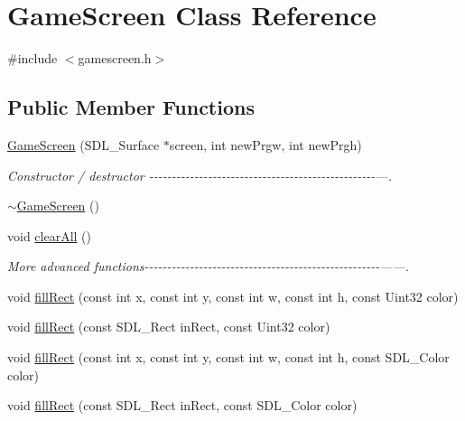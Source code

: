\hypertarget{classGameScreen}{}\section{Game\+Screen Class Reference}
\label{classGameScreen}


{\ttfamily \#include $<$gamescreen.\+h$>$}

\subsection*{Public Member Functions}
\begin{DoxyCompactItemize}
\item 
\hyperlink{classGameScreen_a261e48ed7a96ea0df0a45a524fdc0f9a}{Game\+Screen} (S\+D\+L\+\_\+\+Surface $\ast$screen, int new\+Prgw, int new\+Prgh)
\begin{DoxyCompactList}\small\item\em Constructor / destructor -\/-\/-\/-\/-\/-\/-\/-\/-\/-\/-\/-\/-\/-\/-\/-\/-\/-\/-\/-\/-\/-\/-\/-\/-\/-\/-\/-\/-\/-\/-\/-\/-\/-\/-\/-\/-\/-\/-\/-\/-\/-\/-\/-\/-\/-\/-\/-\/-\/-\/---. \end{DoxyCompactList}\item 
\hyperlink{classGameScreen_a0d25dfce42d72954aab40dbccbf1a0b1}{$\sim$\+Game\+Screen} ()
\item 
void \hyperlink{classGameScreen_ae4ba46c43b5c210f9f01c3742a7de32a}{clear\+All} ()
\begin{DoxyCompactList}\small\item\em More advanced functions-\/-\/-\/-\/-\/-\/-\/-\/-\/-\/-\/-\/-\/-\/-\/-\/-\/-\/-\/-\/-\/-\/-\/-\/-\/-\/-\/-\/-\/-\/-\/-\/-\/-\/-\/-\/-\/-\/-\/-\/-\/-\/-\/-\/-\/-\/-\/-\/-\/-\/-\/-\/------. \end{DoxyCompactList}\item 
void \hyperlink{classGameScreen_aecc2e4702ee552f8910674098f58d78a}{fill\+Rect} (const int x, const int y, const int w, const int h, const Uint32 color)
\item 
void \hyperlink{classGameScreen_ab6288b5bf5e4b55f13dd0fa57bb00cdd}{fill\+Rect} (const S\+D\+L\+\_\+\+Rect in\+Rect, const Uint32 color)
\item 
void \hyperlink{classGameScreen_ae953ed6c4d9d05ed833aca57197251ce}{fill\+Rect} (const int x, const int y, const int w, const int h, const S\+D\+L\+\_\+\+Color color)
\item 
void \hyperlink{classGameScreen_ad238ac7edbdcd2146e46549046c3a66c}{fill\+Rect} (const S\+D\+L\+\_\+\+Rect in\+Rect, const S\+D\+L\+\_\+\+Color color)

\end{DoxyCompactItemize}
